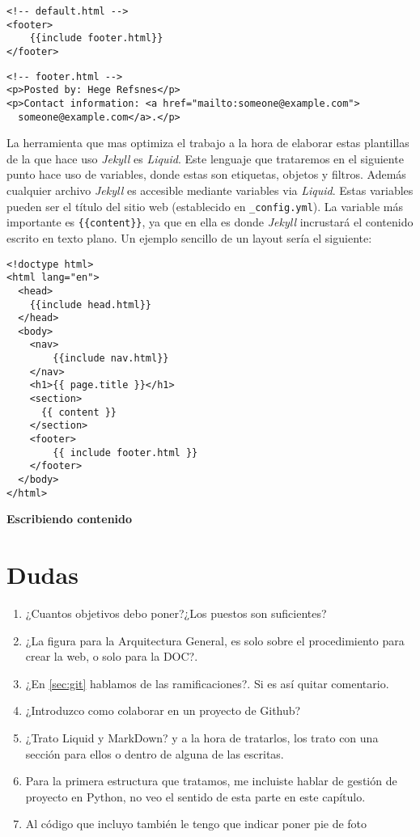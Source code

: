 \documentclass[a4paper, 12pt]{book}
\begin{document}
\begin{lstlisting}[style=htmlcssjs,title=default.html]
<!-- default.html -->
<footer>
    {{include footer.html}}
</footer>
\end{lstlisting}
\begin{lstlisting}[style=htmlcssjs,title=footer.html]
<!-- footer.html -->
<p>Posted by: Hege Refsnes</p>
<p>Contact information: <a href="mailto:someone@example.com">
  someone@example.com</a>.</p>
\end{lstlisting}
\newpage
La herramienta que mas optimiza el trabajo a la hora de elaborar estas plantillas de la que hace uso \emph{Jekyll} es \emph{Liquid}. Este lenguaje que trataremos en el siguiente punto hace uso de variables, donde estas son etiquetas, objetos y filtros. Además cualquier archivo \emph{Jekyll} es accesible mediante variables via \emph{Liquid}. Estas variables pueden ser el título del sitio web (establecido en \texttt{\_config.yml}). La variable más importante es \texttt{\{\{content\}\}}, ya que en ella es donde \emph{Jekyll} incrustará el contenido escrito en texto plano. Un ejemplo sencillo de un layout sería el siguiente:
\begin{lstlisting}[style=htmlcssjs,title=default.html]
<!doctype html>
<html lang="en">
  <head>
    {{include head.html}}
  </head>
  <body>
    <nav>
        {{include nav.html}}
    </nav>
    <h1>{{ page.title }}</h1>
    <section>
      {{ content }}
    </section>
    <footer>
        {{ include footer.html }}
    </footer>
  </body>
</html>
\end{lstlisting}
\textbf{\large{Escribiendo contenido}} \\

\chapter*{Dudas}
\begin{enumerate}
    \item ¿Cuantos objetivos debo poner?¿Los puestos son suficientes?
    \item ¿La figura para la Arquitectura General, es solo sobre el procedimiento para crear la web, o solo para la DOC?. \\
    \item ¿En \ref{sec:git} hablamos de las ramificaciones?. Si es así quitar comentario.
    \item ¿Introduzco como colaborar en un proyecto de Github?
    \item ¿Trato Liquid y MarkDown? y a la hora de tratarlos, los trato con una sección para ellos o dentro de alguna de las escritas.
    \item Para la primera estructura que tratamos, me incluiste hablar de gestión de proyecto en Python, no veo el sentido de esta parte en este capítulo.
    \item Al código que incluyo también le tengo que indicar poner pie de foto
\end{enumerate}
\end{document}

